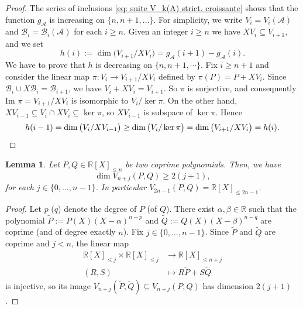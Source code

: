 \documentclass[JEP,XML,SOM,Unicode,NoFloatCountersInSection,published]{cedram}
\newcommand\bR{\mathbb{R}}
\newcommand\cA{\mathcal{A}}
\newcommand\cB{\mathcal{B}}
\newcommand\tP{\widetilde{P}}
\newcommand\tQ{\widetilde{Q}}
\let\subset \subseteq
\theoremstyle{definition}
\theoremstyle{plain}
\newtheorem{Lem}[Def]{Lemma}
\begin{document}
\begin{proof}
The series of inclusions \eqref{eq: suite V_k(A) strict. croissante} shows that the function $g_\cA$ is increasing on $\{n,n+1,\dots\}$. For simplicity, we write $V_i=V_{i}(\cA)$ and $\cB_{i} = \cB_{i}(\cA)$ for each $i \geq n$. Given an integer $i\geq n$ we have $XV_{i}\subset V_{i+1}$, and we set
\[
h(i):= \dim \big(V_{i+1}/XV_{i}\big) = g_\cA(i+1)-g_\cA(i).
\]
We have to prove that $h$ is decreasing on $\{n,n+1,\cdots\}$. Fix $i\geq n+1$ and consider the linear map $\pi : V_i \to V_{i+1}/XV_{i}$ defined by $\pi(P) = P + XV_{i}$. Since $\cB_{i}\cup X\cB_{i} = \cB_{i+1}$, we have $V_i + XV_i = V_{i+1}$. So $\pi$ is surjective, and consequently $\textrm{Im } \pi = V_{i+1}/XV_{i}$ is isomorphic to $V_i / \ker \pi$.
On the other hand, $XV_{i-1}\subset V_{i} \cap XV_{i} \subset \ker\pi$, so $XV_{i-1}$ is subspace of $\ker \pi$. Hence
\begin{equation*}
h(i-1) = \dim \big(V_{i}/XV_{i-1}\big) \geq \dim\big(V_i / \ker \pi \big) = \dim \big(V_{i+1}/XV_{i}\big) = h(i).\qedhere
\end{equation*}
\end{proof}

\begin{Lem}
\label{lem : dim V_n+j(P,Q)}
Let $P,Q \in \bR[X]_{\leq n}$ be two coprime polynomials. Then, we have
\begin{equation*}
\dim V_{n+j}(P,Q) \geq 2(j+1),
\end{equation*}
for each $j\in\{0,\dots,n-1\}$. In particular $V_{2n-1}(P,Q) = \bR[X]_{\leq 2n-1}$.
\end{Lem}

\begin{proof}
Let $p$ (\resp $q$) denote the degree of $P$ (\resp of $Q$). There exist $\alpha,\beta\in\bR$ such that the polynomial $\tP := P(X)(X-\alpha)^{n-p}$ and $\tQ:= Q(X)(X-\beta)^{n-q}$ are coprime (and of degree exactly $n$). Fix $j\in\{0,\dots,n-1\}$. Since $\tP$ and $\tQ$ are coprime and $j<n$, the linear map
\begin{align*}
\bR[X]_{\leq j}\times \bR[X]_{\leq j} & \longrightarrow \bR[X]_{\leq n+j} \\
(R,S) & \longmapsto R\tP + S\tQ
\end{align*}
is injective, so its image $V_{n+j}(\tP,\tQ) \subset V_{n+j}(P,Q)$ has dimension $2(j+1)$.
\end{proof}
\end{document}
